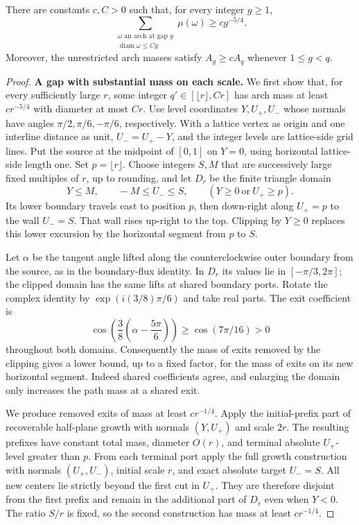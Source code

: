 \begin{unnumberedproposition}
\label{L:prop:caps}
There are constants $c,C>0$ such that, for every integer $g\ge1$,
\[
 \sum_{\substack{\omega\text{ an arch at gap }g\\
                  \operatorname{diam}\omega\le Cg}}
       \mu(\omega)\ge c g^{-5/4}.
\]
Moreover, the unrestricted arch masses satisfy
$A_g\ge c A_q$ whenever $1\le g<q$.
\end{unnumberedproposition}
\begin{proof}
\medskip\noindent\textbf{A gap with substantial mass on each scale.}
We first show that, for every sufficiently large $r$, some integer
$q'\in[\lfloor r\rfloor,Cr]$ has arch mass at least $cr^{-5/4}$
with diameter at most $Cr$.
Use level coordinates $Y,U_+,U_-$ whose normals have angles
$\pi/2,\pi/6,-\pi/6$, respectively.  With a lattice vertex as origin
and one interline distance as unit, $U_-=U_+-Y$, and the integer levels
are lattice-side grid lines.  Put the source at the midpoint of
$[0,1]$ on $Y=0$, using horizontal lattice-side length one.  Set
$p=\lfloor r\rfloor$.  Choose integers $S,M$ that are successively
large fixed multiples of $r$, up to rounding, and let $D_r$ be the
finite triangle domain
\[
 Y\le M,\qquad -M\le U_-\le S,\qquad
 (Y\ge0\ \text{or}\ U_+\ge p).
\]
Its lower boundary travels east to position $p$, then down-right
along $U_+=p$ to the wall $U_-=S$.  That wall rises up-right to the
top.  Clipping by $Y\ge0$ replaces this lower excursion by the
horizontal segment from $p$ to $S$.

Let $\alpha$ be the tangent angle lifted along the counterclockwise
outer boundary from the source, as in the boundary-flux identity.
In $D_r$ its values lie in $[-\pi/3,2\pi]$; the clipped domain has
the same lifts at shared boundary ports.  Rotate the complex identity
by $\exp(i(3/8)\pi/6)$ and take real parts.  The exit coefficient is
\[
 \cos\!\left(\frac38\left(\alpha-\frac{5\pi}{6}\right)\right)
 \ge\cos(7\pi/16)>0
\]
throughout both domains.  Consequently the mass of exits removed by
the clipping gives a lower bound, up to a fixed factor, for the mass
of exits on its new horizontal segment.  Indeed shared coefficients
agree, and enlarging the domain only increases the path mass at a
shared exit.

We produce removed exits of mass at least $cr^{-1/4}$.  Apply the
initial-prefix part of recoverable half-plane growth with normals
$(Y,U_+)$ and scale $2r$.  The resulting prefixes have constant total
mass, diameter $O(r)$, and terminal absolute $U_+$-level greater
than $p$.  From each terminal port apply the full growth construction
with normals $(U_+,U_-)$, initial scale $r$, and exact absolute target
$U_-=S$.  All new centers lie strictly beyond the first cut in $U_+$.
They are therefore disjoint from the first prefix and remain in the
additional part of $D_r$ even when $Y<0$.  The ratio $S/r$ is fixed,
so the second construction has mass at least $cr^{-1/4}$.


\end{proof}
